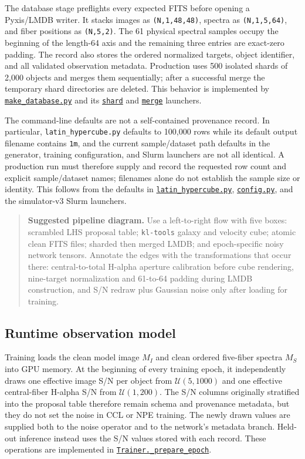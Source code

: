 \documentclass[11pt]{article}
\newcommand{\code}[1]{\nolinkurl{#1}}
\begin{document}
The database stage preflights every expected FITS before opening a Pyxis/LMDB
writer. It stacks images as \code{(N,1,48,48)}, spectra as \code{(N,1,5,64)}, and fiber
positions as \code{(N,5,2)}. The 61 physical spectral samples occupy the beginning
of the length-64 axis and the remaining three entries are exact-zero padding.
The record also stores the ordered normalized targets, object identifier, and
all validated observation metadata. Production uses 500 isolated shards of
2,000 objects and merges them sequentially; after a successful merge the
temporary shard directories are deleted. This behavior is implemented by
\href{../data_generate/make_database.py}{\code{make_database.py}} and its
\href{../data_generate/make_database_simulator_v3.slurm}{\code{shard}} and
\href{../data_generate/merge_database_simulator_v3.slurm}{\code{merge}} launchers.

The command-line defaults are not a self-contained provenance record. In
particular, \code{latin_hypercube.py} defaults to 100,000 rows while its default
output filename contains \code{1m}, and the current sample/dataset path defaults in
the generator, training configuration, and Slurm launchers are not all
identical. A production run must therefore supply and record the requested row
count and explicit sample/dataset names; filenames alone do not establish the
sample size or identity. This follows from the defaults in
\href{../data_generate/latin_hypercube.py}{\code{latin_hypercube.py}},
\href{../arch/config.py}{\code{config.py}}, and the simulator-v3 Slurm launchers.

\begin{quote}
\small
\textbf{Suggested pipeline diagram.} Use a left-to-right flow with five boxes:
scrambled LHS proposal table; \code{kl-tools} galaxy and velocity cube; atomic
clean FITS files; sharded then merged LMDB; and epoch-specific noisy network
tensors. Annotate the edges with the transformations that occur there:
central-to-total H-alpha aperture calibration before cube rendering,
nine-target normalization and 61-to-64 padding during LMDB construction,
and S/N redraw plus Gaussian noise only after loading for training.
\end{quote}

\subsection{Runtime observation model}

Training loads the clean model image \(M_I\) and clean ordered five-fiber
spectra \(M_S\) into GPU memory. At the beginning of every training epoch, it
independently draws one effective image S/N per object from
\(\mathcal U(5,1000)\) and one effective central-fiber H-alpha S/N from
\(\mathcal U(1,200)\). The S/N columns originally stratified into the
proposal table therefore remain schema and provenance metadata, but they do
not set the noise in CCL or NPE training. The newly drawn values are supplied
both to the noise operator and to the network's metadata branch. Held-out
inference instead uses the S/N values stored with each record. These operations
are implemented in \href{../arch/train.py}{\code{Trainer._prepare_epoch}}.
\end{document}
